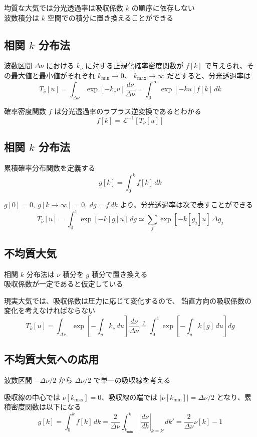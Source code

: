 \documentclass[article]{dennou777}
\begin{document}
均質な大気では分光透過率は吸収係数 $k$ の順序に依存しない\\
波数積分は $k$ 空間での積分に置き換えることができる

\subsection{相関 $k$ 分布法}
波数区間 $\Delta\nu$ における $k_\nu$ に対する正規化確率密度関数が
$f[k]$ で与えられ、その最大値と最小値がそれぞれ $k_{\mathrm{min}}\to0$、
$k_{\mathrm{max}}\to\infty$ だとすると、分光透過率は
\[T_{\bar\nu}[u]=\int_{\Delta\nu}\exp[-k_\nu u]\frac{d\nu}{\Delta\nu}=\int^\infty_0 \exp[-ku]f[k]\,dk\]

確率密度関数 $f$ は分光透過率のラプラス逆変換であるとわかる
\[f[k]=\mathcal{L}^{-1}[T_{\bar\nu}[u]]\]

\subsection{相関 $k$ 分布法}
累積確率分布関数を定義する
\[g[k]=\int^k_0 f[k]\,dk\]

$g[0]=0,\ g[k\to\infty]=0,\ dg=f\,dk$ より、分光透過率は次で表すことができる
\[T_{\bar\nu}[u]=\int^1_0 \exp[-k[g]u]\,dg\simeq\sum_j\exp[-k[g_j]u]\,\Delta g_j\]

\subsection{不均質大気}
相関 $k$ 分布法は $\nu$ 積分を $g$ 積分で置き換える\\
吸収係数が一定であると仮定している

現実大気では、吸収係数は圧力に応じて変化するので、
鉛直方向の吸収係数の変化を考えなければならない
\[
	T_{\bar\nu}[u]
	=\int_{\Delta\nu}\exp\left[-\int_u k_\nu\,du\right]\frac{d\nu}{\Delta\nu}
	\stackrel{?}{=}\int^1_0\exp\left[-\int_uk[g]\,du\right]dg
\]

\subsection{不均質大気への応用}
波数区間 $-\Delta\nu/2$ から $\Delta\nu/2$ で単一の吸収線を考える

吸収線の中心では $\nu[k_{\mathrm{max}}]=0$、吸収線の端では
$|\nu[k_{\mathrm{min}}]|=\Delta\nu/2$ となり、累積密度関数は以下になる
\[
	g[k]=\int^k_0 f[k]\,dk
	=\frac{2}{\Delta\nu}\int^k_{k_{\mathrm{min}}}\left|\frac{d\nu}{dk}\right|_{k=k'}dk'
	=\frac{2}{\Delta\nu}\nu[k]-1
\]
\end{document}
